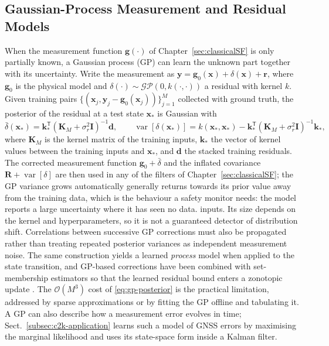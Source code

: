 \documentclass[graybox,envcountchap]{style/SNmono}
\providecommand{\DIFadd}[1]{{\protect\color{blue} #1}} %
\providecommand{\DIFdel}[1]{{\protect\color{red} #1}} %
\providecommand{\DIFaddbegin}{} %
\providecommand{\DIFaddend}{} %
\providecommand{\DIFdelbegin}{} %
\providecommand{\DIFdelend}{} %
\begin{document}
\subsection{Gaussian-Process Measurement and Residual Models}
\label{subsec:gp-models}
When the measurement function $\mathbf{g}(\cdot)$ of Chapter~\ref{sec:classicalSF} is only partially known, a Gaussian process (GP) \cite{rasmussen2006_gp} can learn the unknown part together with its uncertainty. Write the measurement as $\mathbf{y}=\mathbf{g}_0(\mathbf{x})+\delta(\mathbf{x})+\mathbf{r}$, where $\mathbf{g}_0$ is the physical model and $\delta(\cdot)\sim\mathcal{GP}(0,k(\cdot,\cdot))$ a residual with kernel $k$. Given training pairs $\{(\mathbf{x}_j,\mathbf{y}_j-\mathbf{g}_0(\mathbf{x}_j))\}_{j=1}^{M}$ collected with ground truth, the posterior of the residual at a test state $\mathbf{x}_*$ is Gaussian with
\begin{equation}
\bar{\delta}(\mathbf{x}_*)=\mathbf{k}_*^{\mathsf T}(\mathbf{K}_{M}+\sigma_r^{2}\mathbf{I})^{-1}\mathbf{d},\qquad
\operatorname{var}[\delta(\mathbf{x}_*)]=k(\mathbf{x}_*,\mathbf{x}_*)-\mathbf{k}_*^{\mathsf T}(\mathbf{K}_{M}+\sigma_r^{2}\mathbf{I})^{-1}\mathbf{k}_*,
\label{eq:gp-posterior}
\end{equation}
where $\mathbf{K}_{M}$ is the kernel matrix of the training inputs, $\mathbf{k}_*$ the vector of kernel values between the training inputs and $\mathbf{x}_*$, and $\mathbf{d}$ the stacked training residuals. The corrected measurement function $\mathbf{g}_0+\bar{\delta}$ and the inflated covariance $\mathbf{R}+\operatorname{var}[\delta]$ are then used in any of the filters of Chapter~\ref{sec:classicalSF}; the GP variance \DIFdelbegin \DIFdel{grows automatically }\DIFdelend \DIFaddbegin \DIFadd{generally returns towards its prior value }\DIFaddend away from the training \DIFdelbegin \DIFdel{data, which is the behaviour a safety monitor needs: the model reports a large uncertainty where it has seen no data. }\DIFdelend \DIFaddbegin \DIFadd{inputs. Its size depends on the kernel and hyperparameters, so it is not a guaranteed detector of distribution shift. Correlations between successive GP corrections must also be propagated rather than treating repeated posterior variances as independent measurement noise. }\DIFaddend The same construction yields a learned \emph{process} model when applied to the state transition, and GP-based corrections have been combined with set-membership estimators so that the learned residual bound enters a zonotopic update \cite{li2022_gp_zkf}. The $\mathcal{O}(M^{3})$ cost of \eqref{eq:gp-posterior} is the practical limitation, addressed by sparse approximations or by fitting the GP offline and tabulating it. A GP can also describe how a measurement error evolves in time; Sect.~\ref{subsec:c2k-application} learns such a model of GNSS errors by maximising the marginal likelihood and uses its state-space form inside a Kalman filter.
\end{document}
